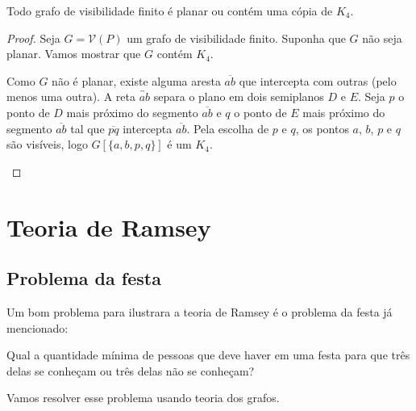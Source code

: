 \begin{teorema}\label{planork4}
    Todo grafo de visibilidade finito é planar ou contém uma cópia de $K_4$.
\end{teorema}
\begin{proof}
    Seja $G=\mathcal V(P)$ um grafo de visibilidade finito. Suponha que $G$ não seja planar. Vamos mostrar que $G$ contém $K_4$.

    Como $G$ não é planar, existe alguma aresta $\overline{ab}$ que intercepta com outras (pelo menos uma outra). A reta $\overleftrightarrow{ab}$ separa o plano em dois semiplanos $D$ e $E$. Seja $p$ o ponto de $D$ mais próximo do segmento $\overline{ab}$ e $q$ o ponto de $E$ mais próximo do segmento $\overline{ab}$ tal que $\overline{pq}$ intercepta $\overline{ab}$. Pela escolha de $p$ e $q$, os pontos $a$, $b$, $p$ e $q$ são visíveis, logo $G[\{a,b,p,q\}]$ é um $K_4$.
    \begin{center}
    \end{center}
\end{proof}

\section {Teoria de Ramsey}

\subsection {Problema da festa}
Um bom problema para ilustrara a teoria de Ramsey é o problema da festa já mencionado:

\begin{problem}
    Qual a quantidade mínima de pessoas que deve haver em uma festa para que três delas se conheçam ou três delas não se conheçam?
\end{problem}

Vamos resolver esse problema usando teoria dos grafos.

